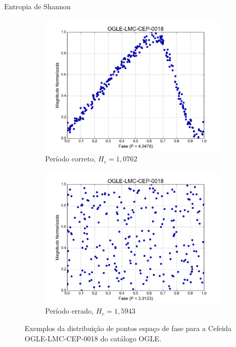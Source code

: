 \documentclass{beamer}
\begin{document}
\begin{frame}[allowframebreaks]{Entropia de Shannon}
\begin{figure}
\centering
\begin{subfigure}{.5\textwidth}
  \centering
  \includegraphics[width=\linewidth]{esp_fase_correto.png}
  \caption{Período correto, $H_c = 1,0762$}
  \label{fig:esp_fase_correto}
\end{subfigure}%
\begin{subfigure}{.5\textwidth}
  \centering
  \includegraphics[width=\linewidth]{esp_fase_errado.png}
  \caption{Período errado, $H_c = 1,5943$}
  \label{fig:esp_fase_errado}
\end{subfigure}
\caption[Exemplos de entropia]{Exemplos da distribuição de pontos espaço de fase para a Cefeida OGLE-LMC-CEP-0018 do catálogo OGLE.}
\label{fig:exemplo_entropia}
\end{figure}
\end{frame}
\end{document}
